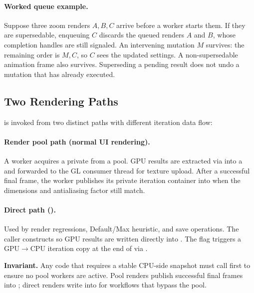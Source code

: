 \paragraph{Worked queue example.}
Suppose three zoom renders $A,B,C$ arrive before a worker starts them. If they
are supersedable, enqueuing $C$ discards the queued renders $A$ and $B$, whose
completion handles are still signaled. An intervening mutation $M$ survives:
the remaining order is $M,C$, so $C$ sees the updated settings. A non-supersedable
animation frame also survives. Superseding a pending result does not undo a
mutation that has already executed.

\subsection{Two Rendering Paths}
\label{subsec:two-render-paths}

 is invoked from two distinct paths with different iteration
data flow:

\paragraph{Render pool path (normal UI rendering).}
A worker acquires a private  from a pool.  GPU
results are extracted via  into a  and
forwarded to the GL consumer thread for texture upload.  After a successful
final frame, the worker publishes its private iteration container into
 when the dimensions and antialiasing factor still match.

\paragraph{Direct path ().}
Used by  render regressions,  Default/Max heuristic, and save
operations.  The caller constructs
 so GPU results are written directly
into .  The  flag triggers a
GPU\(\to\)CPU iteration copy at the end of  via
.

\textbf{Invariant.}  Any code that requires a stable CPU-side
 snapshot must call  first
to ensure no pool workers are active.  Pool renders publish successful final
frames into ; direct renders write into 
for workflows that bypass the pool.

